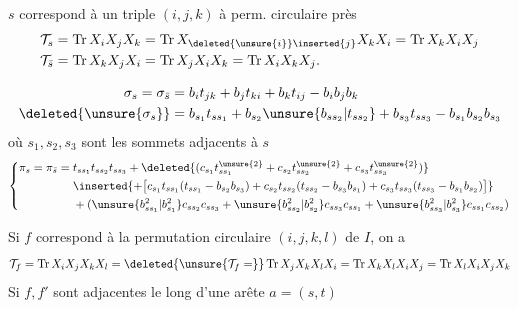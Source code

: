$s$ correspond à un triple $(i,j,k)$ à perm. circulaire près
\[\begin{aligned}
\mathcal T_s&=\operatorname{Tr}X_iX_jX_k
 =\operatorname{Tr}X_{\deleted{\unsure{i}}\inserted{j}}X_kX_i
 =\operatorname{Tr}X_kX_iX_j\\
\mathcal T_{\bar s}&=\operatorname{Tr}X_kX_jX_i
 =\operatorname{Tr}X_jX_iX_k=\operatorname{Tr}X_iX_kX_j .
\end{aligned}\]

\[\begin{aligned}
\sigma_s=\sigma_{\bar s}&=b_it_{jk}+b_jt_{ki}+b_kt_{ij}-b_ib_jb_k\\
\deleted{\unsure{\sigma_s}}&=b_{s_1}t_{ss_1}+b_{s_2}\unsure{b_{ss_2}|t_{ss_2}}+b_{s_3}t_{ss_3}-b_{s_1}b_{s_2}b_{s_3}
\end{aligned}\]
où $s_1,s_2,s_3$ sont les sommets adjacents à $s$
\[\left\{\begin{aligned}
\pi_s=\pi_{\bar s}={}&t_{ss_1}t_{ss_2}t_{ss_3}
 +\deleted{(c_{s_1}t_{ss_1}^{\unsure{2}}+c_{s_2}t_{ss_2}^{\unsure{2}}+c_{s_3}t_{ss_3}^{\unsure{2}})}\\
&\inserted{+\bigl[c_{s_1}t_{ss_1}(t_{ss_1}-b_{s_2}b_{s_3})
 +c_{s_2}t_{ss_2}(t_{ss_2}-b_{s_3}b_{s_1})
 +c_{s_3}t_{ss_3}(t_{ss_3}-b_{s_1}b_{s_2})\bigr]}\\
&+(\unsure{b_{ss_1}^{2}|b_{s_1}^{2}}c_{ss_2}c_{ss_3}
 +\unsure{b_{ss_2}^{2}|b_{s_2}^{2}}c_{ss_3}c_{ss_1}
 +\unsure{b_{ss_3}^{2}|b_{s_3}^{2}}c_{ss_1}c_{ss_2})
\end{aligned}\right.\]

Si $f$ correspond à la permutation circulaire $(i,j,k,l)$ de $I$, on a
\[\mathcal T_f=\operatorname{Tr}X_iX_jX_kX_l
 =\deleted{\unsure{\mathcal T_f=}}\operatorname{Tr}X_jX_kX_lX_i
 =\operatorname{Tr}X_kX_lX_iX_j=\operatorname{Tr}X_lX_iX_jX_k\]
Si $f,f'$ sont adjacentes le long d'une arête $a=(s,t)$


